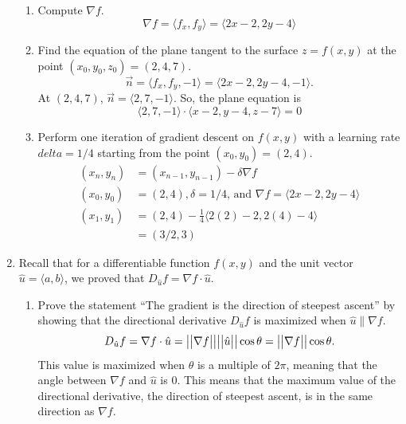 \begin{enumerate}
\begin{enumerate}[label=\alph*.]
		\item Compute $\nabla f$.
		\begin{equation*}
			\nabla f = \langle f_x, f_y\rangle = \langle 2x-2, 2y-4 \rangle
		\end{equation*}
		
		\item Find the equation of the plane tangent to the surface $z = f(x,y)$ at the point $(x_0, y_0, z_0) = (2,4,7)$.
		\begin{equation*}
			\vec{n} = \langle f_x, f_y, -1\rangle = \langle 2x-2, 2y-4, -1 \rangle.
		\end{equation*}
		At $(2,4,7)$, $\vec{n} = \langle 2, 7, -1 \rangle$. So, the plane equation is 
		\begin{equation*}
			\langle 2, 7, -1 \rangle \cdot \langle x-2, y-4, z-7 \rangle = 0
		\end{equation*}
		
		\item Perform one iteration of gradient descent on $f(x,y)$ with a learning rate $delta = 1/4$ starting from the point $(x_0,y_0) = (2,4)$.\\
		\begin{align*}
			(x_n, y_n) &= (x_{n-1},y_{n-1}) - \delta\nabla f \\
			(x_0, y_0) &= (2,4), \delta = 1/4 \text{, and } \nabla f = \langle 	2x-2, 2y-4 \rangle \\
			(x_1, y_1) &= (2,4) - \frac{1}{4} \langle 2(2)-2, 2(4)-4 \rangle \\
			&= (3/2, 3)
		\end{align*}
	\end{enumerate}

	\item Recall that for a differentiable function $f(x,y)$ and the unit vector $\hat{u} = \langle a, b \rangle$, we proved that $D_{\hat{u}}f = \nabla f \cdot \hat{u}$.
	\begin{enumerate}[label=\alph*.]
		\item Prove the statement ``The gradient is the direction of steepest ascent'' by showing that the directional derivative $D_{\hat{u}}f$ is maximized when $\hat{u}\parallel\nabla f$.
		\begin{equation*}
			D_{\hat{u}}f = \nabla f \cdot \hat{u}=\big\lvert \big\lvert \nabla f \big\rvert \big\rvert\big\lvert \big\lvert \hat{u} \big\rvert \big\rvert\cos{\theta} = \big\lvert \big\lvert \nabla f \big\rvert \big\rvert\cos{\theta}.
		\end{equation*}
		This value is maximized when $\theta$ is a multiple of $2\pi$, meaning that the angle between $\nabla f$ and $\hat{u}$ is 0. This means that the maximum value of the directional derivative, the direction of steepest ascent, is in the same direction as $\nabla f$.\\
			

\end{enumerate}
\end{enumerate}

